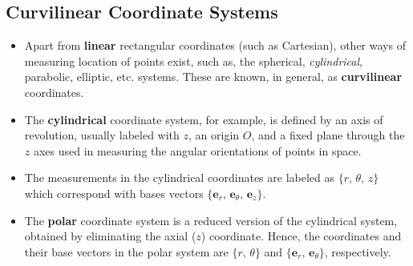 \documentclass[11pt]{article}
\begin{document}
\subsection*{Curvilinear Coordinate Systems}
\label{sec:org2b56ee2}
\begin{itemize}
\item Apart from \textbf{linear} rectangular coordinates (such as Cartesian), other ways of measuring location of points exist, such as, the spherical, \emph{cylindrical}, parabolic, elliptic, etc. systems. These are known, in general, as \textbf{curvilinear} coordinates.

\item The \textbf{cylindrical} coordinate system, for example, is defined by an axis of revolution, usually labeled with \(z\), an origin \(O\), and a fixed plane through the \(z\) axes used in measuring the angular orientations of points in space.

\item The measurements in the cylindrical coordinates are labeled as \(\{r,\,\theta,\,z\}\) which correspond with bases vectors \(\{\boldsymbol{e}_r,\,\boldsymbol{e}_\theta,\, \boldsymbol{e}_z\}\).

\item The \textbf{polar} coordinate system is a reduced version of the cylindrical system, obtained by eliminating the axial (\(z\)) coordinate. Hence, the coordinates and their base vectors in the polar system are  \(\{r,\,\theta\}\) and \(\{\boldsymbol{e}_r,\, \boldsymbol{e}_\theta\}\), respectively.
\end{itemize}
\end{document}
